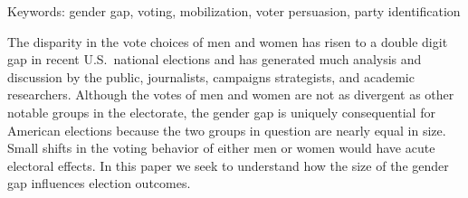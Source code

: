 \documentclass[12pt
               ,final
               ]{article}
\begin{document}
\hfill
\begin{center}
  Keywords: gender gap, voting, mobilization, voter persuasion, party identification
\end{center}















\newpage

\hypersetup{pageanchor = true}

\doublespacing

The disparity in the vote choices of men and women has risen to a double digit gap in recent U.S.\ national elections and has generated much analysis and discussion by the public, journalists, campaigns strategists, and academic researchers. Although the votes of men and women are not as divergent as other notable groups in the electorate, the gender gap is uniquely consequential for American elections because the two groups in question are nearly equal in size. Small shifts in the voting behavior of either men or women would have acute electoral effects. In this paper we seek to understand how the size of the gender gap influences election outcomes.

\end{document}
